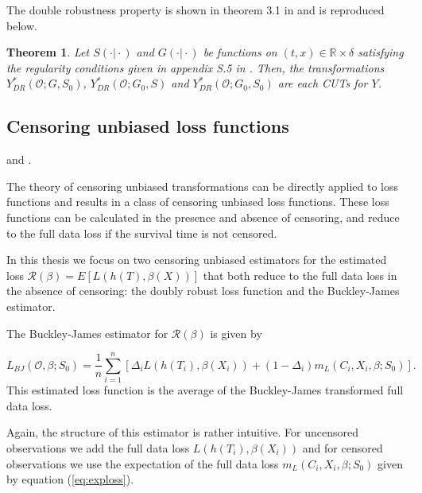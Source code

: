 \documentclass[12pt, a4paper]{article}
\theoremstyle{definition}
\theoremstyle{plain}
\newtheorem{Theorem}{Theorem}[section]
\numberwithin{equation}{section}
\numberwithin{figure}{section}
\numberwithin{table}{section}
\begin{document}
	The double robustness property is shown in theorem 3.1 in \citet*{culs} and is reproduced below.
	
	\begin{Theorem}\label{thm:dr}
		Let $S(\cdot \vert \cdot)$ and $G(\cdot\vert \cdot)$ be functions on $(t,x)\in \mathbb{R} \times \delta$ satisfying the regularity conditions given in appendix S.5 in \citet*{culs}. Then, the transformations $Y_{DR}^* (\mathcal{O}; G, S_0)$, $Y_{DR}^* (\mathcal{O}; G_0, S)$ and $Y_{DR}^* (\mathcal{O}; G_0, S_0)$ are each CUTs for $Y$.
	\end{Theorem}
	


	\subsection{Censoring unbiased loss functions}\label{sec:cudls}
	\citet*{culs} and \citet*{basearticle}.
	
	The theory of censoring unbiased transformations can be directly applied to loss functions and results in a class of censoring unbiased loss functions. 
	These loss functions can be calculated in the presence and absence of censoring, and reduce to the full data loss if the survival time is not censored.
	
	In this thesis we focus on two censoring unbiased estimators for the estimated loss $\mathcal{R} (\beta) = E[L(h(T),\beta(X))]$ that both reduce to the full data loss in the absence of censoring: the doubly robust loss function and the Buckley-James estimator.
	
	
	The Buckley-James estimator for $\mathcal{R}(\beta)$ is given by
	
	\begin{equation}\label{eq:bj}
	L_{BJ}(\mathcal{O}, \beta; S_0) = \frac{1}{n} \sum_{i=1}^n \left[ \Delta_i L(h(T_i), \beta(X_i))+(1-\Delta_i)m_L(C_i, X_i, \beta; S_0)\right].
	\end{equation}
	This estimated loss function is the average of the Buckley-James transformed full data loss.
	
	Again, the structure of this estimator is rather intuitive.
	For uncensored observations we add the full data loss $L(h(T_i), \beta(X_i))$ and for censored observations we use the expectation of the full data loss $m_L(C_i, X_i, \beta; S_0)$ given by equation (\ref{eq:exploss}).
	
\end{document}
